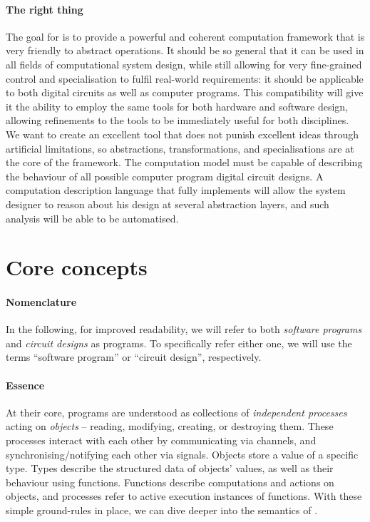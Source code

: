 \paragraph{The right thing}
The goal for {\tetra} is to provide a powerful and coherent computation framework that is very friendly to abstract operations.
It should be so general that it can be used in all fields of computational system design, while still allowing for very fine-grained control and specialisation to fulfil real-world requirements:
	it should be applicable to both digital circuits as well as computer programs.
This compatibility will give it the ability to employ the same tools for both hardware and software design, allowing refinements to the tools to be immediately useful for both disciplines.
We want to create an excellent tool that does not punish excellent ideas through artificial limitations, so abstractions, transformations, and specialisations are at the core of the framework.
The {\tetra} computation model must be capable of describing the behaviour of all possible computer program digital circuit designs.
A computation description language that fully implements {\tetra} will allow the system designer to reason about his design at several abstraction layers, and such analysis will be able to be automatised.

\section{Core concepts}
\paragraph{Nomenclature}
In the following, for improved readability, we will refer to both \emph{software programs} and \emph{circuit designs} as programs.
To specifically refer either one, we will use the terms ``software program'' or ``circuit design'', respectively.

\paragraph{Essence}
At their core, {\tetra} programs are understood as collections of \emph{independent processes} acting on \emph{objects} -- reading, modifying, creating, or destroying them.
These processes interact with each other by communicating via channels, and synchronising/notifying each other via signals.
Objects store a value of a specific type.
Types describe the structured data of objects' values, as well as their behaviour using functions.
Functions describe computations and actions on objects, and processes refer to active execution instances of functions.
With these simple ground-rules in place, we can dive deeper into the semantics of \tetra.
